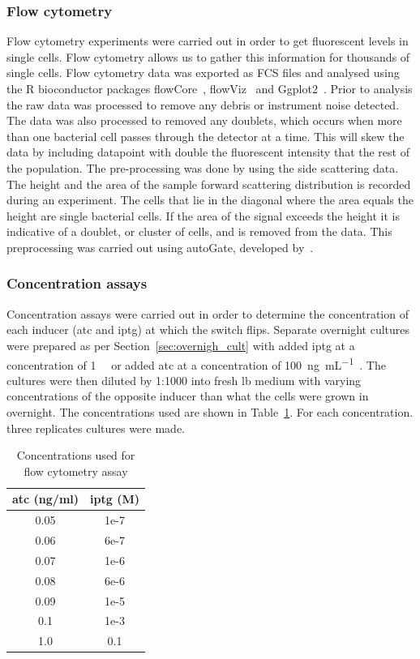 \subsubsection{Flow cytometry}
Flow cytometry experiments were carried out in order to get fluorescent levels in single cells. Flow cytometry allows us to gather this information for thousands of single cells. Flow cytometry data was exported as FCS files and analysed using the R bioconductor packages flowCore~\autocite{flowCore:man}, flowViz~\autocite{flowViz:man} and Ggplot2~\autocite{ggplot2:bk}. Prior to analysis the raw data was processed to remove any debris or instrument noise detected. The data was also processed to removed any doublets, which occurs when more than one bacterial  cell passes through the detector at a time. This will skew the data by including datapoint with double the fluorescent intensity that the rest of the population. The pre-processing was done by using the side scattering data. The height and the area of the sample forward scattering distribution is recorded during an experiment. The cells that lie in the diagonal where the area equals the height are single bacterial cells. If the area of the signal exceeds the height it is indicative of a doublet, or cluster of cells, and is removed from the data. This preprocessing was carried out using autoGate, developed by~\textcite{Fedorec2016}. 



\subsubsection{Concentration assays}
\label{sec:flo_conc}
Concentration assays were carried out in order to determine the concentration of each inducer (\acrshort{atc} and \acrshort{iptg}) at which the switch flips.  Separate overnight cultures were prepared as per Section~\ref{sec:overnigh_cult} with added \acrshort{iptg} at a concentration of \SI{1}{\milli\molar} or added \acrshort{atc} at a concentration of \SI{100}{\nano\gram\per\milli\liter}~\autocite{Litcofsky:2012gr}. The cultures were then diluted by 1:1000 into fresh \acrshort{lb} medium with varying concentrations of the opposite inducer than what the cells were grown in overnight. The concentrations used are shown in Table~\ref{tab:flow_conc}. For each concentration. three replicates cultures were made.


\begin{table}[tb]
\centering
\caption{Concentrations used for flow cytometry assay}
\label{tab:flow_conc}
\begin{tabular}{@{}cc@{}}
\toprule
\acrshort{atc} (ng/ml)  & \acrshort{iptg} (M) \\ \midrule
0.05 & 1e-7 \\
0.06 & 6e-7 \\
0.07 & 1e-6 \\
0.08 & 6e-6 \\
0.09 & 1e-5 \\
0.1  & 1e-3 \\
1.0  & 0.1  \\ \bottomrule
\end{tabular}
\end{table}

